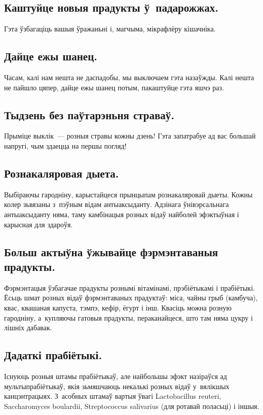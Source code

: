 \subsection{Каштуйце новыя прадукты ў~падарожжах.}
Гэта ўзбагаціць вашыя ўражаньні і, магчыма, мікрафлёру кішачніка.

\subsection{Дайце ежы шанец.}
Часам, калі нам нешта не даспадобы, мы выключаем гэта назаўжды. Калі нешта не пайшло цяпер, дайце ежы шанец потым, пакаштуйце гэта яшчэ раз.

\subsection{Тыдзень без паўтарэньня страваў.}
Прыміце выклік~--- розныя стравы кожны дзень! Гэта запатрабуе ад вас большай напругі, чым здаецца на першы погляд!

\subsection{Рознакаляровая дыета.}
Выбіраючы гародніну, карыстайцеся прынцыпам рознакаляровай дыеты. Кожны колер зьвязаны з~пэўным відам антыаксыданту. Адзінага ўнівэрсальнага антыаксыданту няма, таму камбінацыя розных відаў найболей эфэктыўная і карысная для здароўя.

\subsection{Больш актыўна ўжывайце фэрмэнтаваныя прадукты.}
Фэрмэнтацыя ўзбагачае прадукты рознымі вітамінамі, прэбіётыкамі і прабіётыкі. Ёсьць шмат розных відаў фэрмэнтаваных прадуктаў: міса, чайны грыб (камбуча), квас, квашаная капуста, тэмпэ, кефір, ёгурт і інш. Квасіць можна розную гародніну, а~купляючы гатовыя прадукты, пераканайцеся, што там няма цукру і лішніх дабавак.

\subsection{Дадаткі прабіётыкі.}
Існуюць розныя штамы прабіётыкаў, але найбольшы эфэкт назіраўся ад мультыпрабіётыкаў, якія зьмяшчаюць некалькі розных відаў у~вялікшых канцэнтрацыях. З~асобных штамаў вартыя ўвагі Lactobacillus reuteri, Saccharomyces boulardii, Streptococcus salivarius (для ротавай поласьці) і іншыя.


